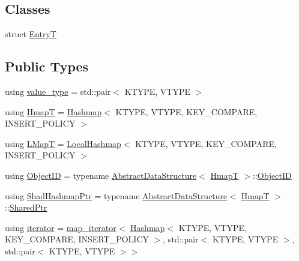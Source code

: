 \subsection*{Classes}
\begin{DoxyCompactItemize}
\item 
struct \hyperlink{structshad_1_1Hashmap_1_1EntryT}{Entry\-T}
\end{DoxyCompactItemize}
\subsection*{Public Types}
\begin{DoxyCompactItemize}
\item 
using \hyperlink{classshad_1_1Hashmap_ad8c0108347b59bcd19ccb8070a313dd8}{value\-\_\-type} = std\-::pair$<$ K\-T\-Y\-P\-E, V\-T\-Y\-P\-E $>$
\item 
using \hyperlink{classshad_1_1Hashmap_a8a56b050ace0e26454959cc45cdcb211}{Hmap\-T} = \hyperlink{classshad_1_1Hashmap}{Hashmap}$<$ K\-T\-Y\-P\-E, V\-T\-Y\-P\-E, K\-E\-Y\-\_\-\-C\-O\-M\-P\-A\-R\-E, I\-N\-S\-E\-R\-T\-\_\-\-P\-O\-L\-I\-C\-Y $>$
\item 
using \hyperlink{classshad_1_1Hashmap_aace37116c38330a70352a3081d0ec07e}{L\-Map\-T} = \hyperlink{classshad_1_1LocalHashmap}{Local\-Hashmap}$<$ K\-T\-Y\-P\-E, V\-T\-Y\-P\-E, K\-E\-Y\-\_\-\-C\-O\-M\-P\-A\-R\-E, I\-N\-S\-E\-R\-T\-\_\-\-P\-O\-L\-I\-C\-Y $>$
\item 
using \hyperlink{classshad_1_1Hashmap_a1f10a3b0cce639008b5b9444eb167f8b}{Object\-I\-D} = typename \hyperlink{classshad_1_1AbstractDataStructure}{Abstract\-Data\-Structure}$<$ \hyperlink{classshad_1_1Hashmap_a8a56b050ace0e26454959cc45cdcb211}{Hmap\-T} $>$\-::\hyperlink{classshad_1_1Hashmap_a1f10a3b0cce639008b5b9444eb167f8b}{Object\-I\-D}
\item 
using \hyperlink{classshad_1_1Hashmap_a5d013a5199b5745a1877b321af1b86ee}{Shad\-Hashmap\-Ptr} = typename \hyperlink{classshad_1_1AbstractDataStructure}{Abstract\-Data\-Structure}$<$ \hyperlink{classshad_1_1Hashmap_a8a56b050ace0e26454959cc45cdcb211}{Hmap\-T} $>$\-::\hyperlink{classshad_1_1AbstractDataStructure_a8bb29450966955c546d40421ce46316f}{Shared\-Ptr}
\item 
using \hyperlink{classshad_1_1Hashmap_a4603e48d3ad3a380abc888671e55bf01}{iterator} = \hyperlink{classshad_1_1map__iterator}{map\-\_\-iterator}$<$ \hyperlink{classshad_1_1Hashmap}{Hashmap}$<$ K\-T\-Y\-P\-E, V\-T\-Y\-P\-E, K\-E\-Y\-\_\-\-C\-O\-M\-P\-A\-R\-E, I\-N\-S\-E\-R\-T\-\_\-\-P\-O\-L\-I\-C\-Y $>$, std\-::pair$<$ K\-T\-Y\-P\-E, V\-T\-Y\-P\-E $>$, std\-::pair$<$ K\-T\-Y\-P\-E, V\-T\-Y\-P\-E $>$$>$
$$
\end{DoxyCompactItemize}
